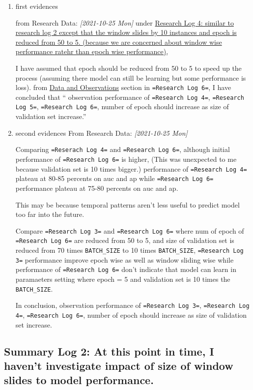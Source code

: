 \documentclass[11pt]{article}
\begin{document}
\begin{enumerate}
\item first evidences
\label{sec:orge598665}

from Research Data: \textit{[2021-10-25 Mon] } under \hyperref[sec:orgcb0b1c0]{Research Log 4: similar to research log 2 except that the window slides by 10 instances and epoch is reduced from 50 to 5. (because we are concerned about window wise performance ratehr than epoch wise performance)},


I have assumed that epoch should be reduced from 50 to 5 to speed up the process (assuming there model can still be learning but some performance is loss).
from \hyperref[sec:org480463b]{Data and Observations} section in \texttt{=Research Log 6=}, I have concluded that
`` observation performance of \texttt{=Research Log 4=}, \texttt{=Research Log 5=}, \texttt{=Research Log 6=}, number of epoch should increase as size of validation set increase.''

\item second evidences
\label{sec:org9f1a964}
From Research Data: \textit{[2021-10-25 Mon]}

Comparing \texttt{=Reserach Log 4=} and \texttt{=Research Log 6=}, although initial performance of \texttt{=Research Log 6=} is higher, (This was unexpected to me because validation set is 10 times bigger.) performance of \texttt{=Research Log 4=} plateau at 80-85 percents on auc and ap while \texttt{=Research Log 6=} performance plateau at 75-80 percents on auc and ap.

This may be because temporal patterns aren't less useful to predict model too far into the future.

Compare \texttt{=Research Log 3=} and \texttt{=Research Log 6=} where num of epoch of \texttt{=Research Log 6=} are reduced from 50 to 5, and size of validation set is reduced from 70 times \texttt{BATCH\_SIZE} to 10 times \texttt{BATCH\_SIZE}, \texttt{=Research Log 3=} performance improve epoch wise as well as window sliding wise while performance of \texttt{=Research Log 6=} don't indicate that model can learn in paramaeters setting where epoch = 5 and validation set is 10 times the \texttt{BATCH\_SIZE}.

In conclusion, observation performance of \texttt{=Research Log 3=}, \texttt{=Research Log 4=}, \texttt{=Research Log 6=}, number of epoch should increase as size of validation set increase.
\end{enumerate}


\subsection{Summary Log 2: At this point in time, I haven't investigate impact of size of window slides to model performance.}
\label{sec:org2e36fce}
\end{document}

